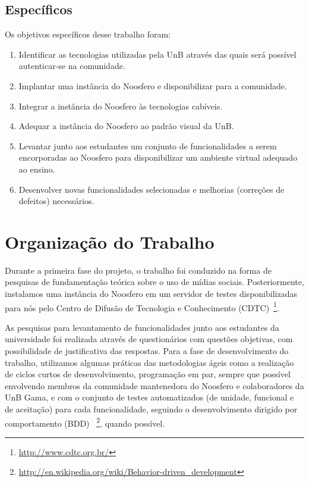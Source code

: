  
 
\subsection{Específicos}
 
Os objetivos específicos desse trabalho foram:
 
\begin{enumerate}
    
\item Identificar as tecnologias utilizadas pela UnB através das quais será
possível autenticar-se na comunidade.
\item Implantar uma instância do Noosfero e disponibilizar para a comunidade.
\item Integrar a instância do Noosfero às tecnologias cabíveis.
\item Adequar a instância do Noosfero ao padrão visual da UnB.
\item Levantar junto aos estudantes um conjunto de funcionalidades a serem
encorporadas ao Noosfero para disponibilizar um ambiente virtual adequado ao
ensino.
\item Desenvolver novas funcionalidades selecionadas e melhorias (correções de defeitos) necessários.
 
\end{enumerate}
 
 
\section{Organização do Trabalho}
 
Durante a primeira fase do projeto, o trabalho foi conduzido na forma de
pesquisas de fundamentação teórica sobre o uso de mídias sociais.
Posteriormente, instalamos uma instância do Noosfero em um
servidor de testes disponibilizadas para nós pelo Centro de Difusão de
Tecnologia e Conhecimento (CDTC)~\footnote{\url{http://www.cdtc.org.br/}}. 
 
As pesquisas para levantamento de funcionalidades junto aos estudantes
da universidade foi realizada através de questionários com questões objetivas,
com possibilidade de justificativa das respostas.
%
Para a fase de desenvolvimento do trabalho, utilizamos algumas práticas das
metodologias ágeis como a realização de ciclos curtos de desenvolvimento,
programação em par, sempre que possível envolvendo membros da comunidade
mantenedora do Noosfero e colaboradores da UnB Gama, e com o conjunto de
testes automatizados (de unidade, funcional e de aceitação) para cada funcionalidade,
seguindo o desenvolvimento dirigido por comportamento (BDD)%
~\footnote{\url{http://en.wikipedia.org/wiki/Behavior-driven_development}},
quando possível.
 
